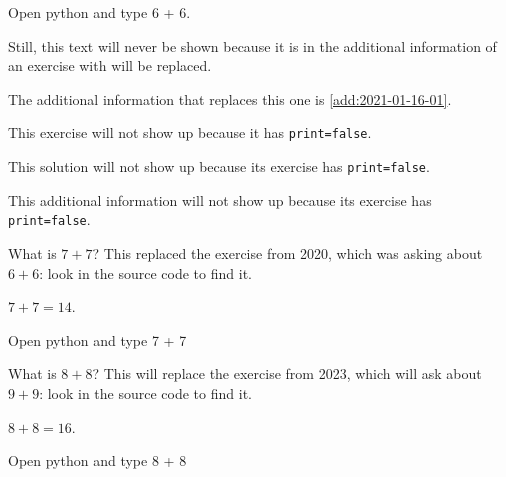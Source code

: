 \documentclass[oneside]{book}
\begin{document}
\begin{additionalinformation}
Open python and type 6 + 6.

Still, this text will never be shown because it is in the additional information of an exercise with will be replaced.

The additional information that replaces this one is \cref{add:2021-01-16-01}.
\end{additionalinformation}

\begin{exercise}[print=false]
This exercise will not show up because it has \texttt{print=false}.
\end{exercise}

\begin{solution}
This solution will not show up because its exercise has \texttt{print=false}.
\end{solution}

\begin{additionalinformation}
This additional information will not show up because its exercise has \texttt{print=false}.
\end{additionalinformation}

\begin{exercise}[examdate={January 16, 2021}, examproblemnumber={1}, examproblemid={2021-01-16-01}]
  What is \(7 + 7\)? This replaced the exercise from 2020, which was asking about \(6 + 6\): look in the source code to find it.
\end{exercise}

\begin{solution}
  \(7 + 7 = 14\).
\end{solution}

\begin{additionalinformation}
Open python and type 7 + 7
\end{additionalinformation}

\begin{exercise}[examdate={January 16, 2022}, examproblemnumber={1}, examproblemid={2022-01-16-01}]
  What is \(8 + 8\)? This will replace the exercise from 2023, which will ask about \(9 + 9\): look in the source code to find it.
\end{exercise}

\begin{solution}
  \(8 + 8 = 16\).
\end{solution}

\begin{additionalinformation}
Open python and type 8 + 8
\end{additionalinformation}
\end{document}
